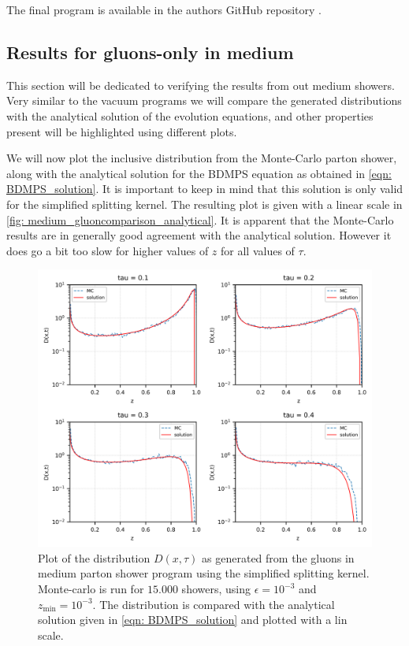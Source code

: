 \documentclass[main.tex]{subfiles}
\begin{document}
The final program is available in the authors GitHub repository \cite{GitHub_thesis}.


\subsection{Results for gluons-only in medium}
This section will be dedicated to verifying the results from out medium showers. Very similar to the vacuum programs we will compare the generated distributions with the analytical solution of the evolution equations, and other properties present will be highlighted using different plots.

We will now plot the inclusive distribution from the Monte-Carlo parton shower, along with the analytical solution for the BDMPS equation as obtained in \autoref{eqn: BDMPS_solution}. It is important to keep in mind that this solution is only valid for the simplified splitting kernel. The resulting plot is given with a linear scale in \autoref{fig: medium_gluoncomparison_analytical}. It is apparent that the Monte-Carlo results are in generally good agreement with the analytical solution. However it does go a bit too slow for higher values of \(z\) for all values of \(\tau\). 
\begin{figure}[htb]
    \centering
    \includegraphics[width=12cm]{pictures/plots/distributions/medium/medium_shower__15k_lin_epsilon3_zmin3_MCandAnalytical.png}
    \caption{Plot of the distribution \(D(x,\tau)\) as generated from the gluons in medium parton shower program using the simplified splitting kernel. Monte-carlo is run for \(15.000\) showers, using \(\epsilon=10^{-3}\) and \(z_{\text{min}} = 10^{-3}\). The distribution is compared with the analytical solution given in \autoref{eqn: BDMPS_solution} and plotted with a lin scale.}
    \label{fig: medium_gluoncomparison_analytical}
\end{figure}
\end{document}

